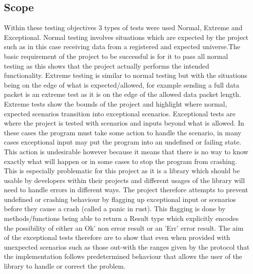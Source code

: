 \documentclass[11pt,a4paper]{article}
\begin{document}
\subsection{Scope}
Within these testing objectives 3 types of tests were used Normal, Extreme and Exceptional. Normal testing involves situations which are expected by the project such as in this case receiving data from a registered and expected universe.The basic requirement of the project to be successful is for it to pass all normal testing as this shows that the project actually performs the intended functionality. Extreme testing is similar to normal testing but with the situations being on the edge of what is expected/allowed, for example sending a full data packet is an extreme test as it is on the edge of the allowed data packet length. Extreme tests show the bounds of the project and highlight where normal, expected scenarios transition into exceptional scenarios. Exceptional tests are where the project is tested with scenarios and inputs beyond what is allowed. In these cases the program must take some action to handle the scenario, in many cases exceptional input may put the program into an undefined or failing state. This action is undesirable however because it means that there is no way to know exactly what will happen or in some cases to stop the program from crashing. This is especially problematic for this project as it is a library which should be usable by developers within their projects and different usages of the library will need to handle errors in different ways. The project therefore attempts to prevent undefined or crashing behaviour by flagging up exceptional input or scenarios before they cause a crash (called a panic in rust). This flagging is done by methods/functions being able to return a Result type which explicitly encodes the possibility of either an Ok' non error result or an 'Err' error result. The aim of the exceptional tests therefore are to show that even when provided with unexpected scenarios such as those out-with the ranges given by the protocol that the implementation follows predetermined behaviour that allows the user of the library to handle or correct the problem.\\
\end{document}
